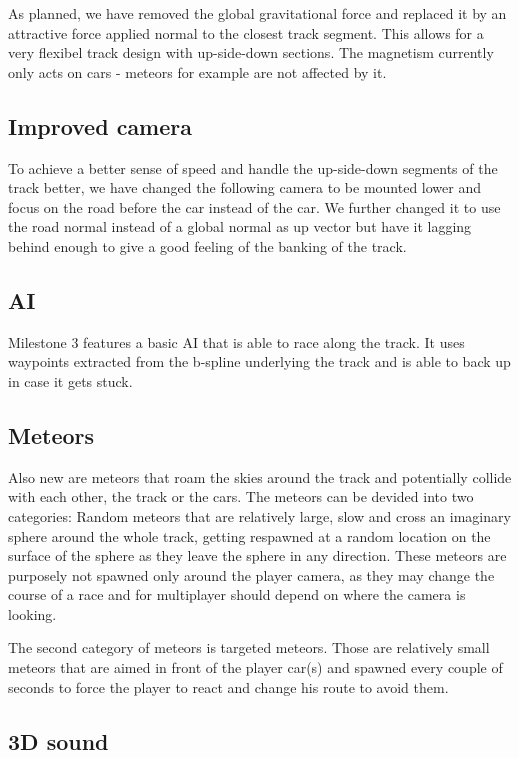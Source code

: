 \documentclass[11pt]{article}
\begin{document}
As planned, we have removed the global gravitational force and replaced it by an attractive force applied normal to the closest track segment.
This allows for a very flexibel track design with up-side-down sections. The magnetism currently only acts on cars - meteors for example are not affected by it.

\subsection{Improved camera}

To achieve a better sense of speed and handle the up-side-down segments of the track better, we have changed the following camera to be mounted lower and focus on the road before the car instead of the car. We further changed it to use the road normal instead of a global normal as up vector but have it lagging behind enough to give a good feeling of the banking of the track.

\subsection{AI}

Milestone 3 features a basic AI that is able to race along the track. It uses waypoints extracted from the b-spline underlying the track and is able to back up in case it gets stuck.

\subsection{Meteors}

Also new are meteors that roam the skies around the track and potentially collide with each other, the track or the cars. The meteors can be devided into two categories: Random meteors that are relatively large, slow and cross an imaginary sphere around the whole track, getting respawned at a random location on the surface of the sphere as they leave the sphere in any direction. These meteors are purposely not spawned only around the player camera, as they may change the course of a race and for multiplayer should depend on where the camera is looking. 

The second category of meteors is targeted meteors. Those are relatively small meteors that are aimed in front of the player car(s) and spawned every couple of seconds to force the player to react and change his route to avoid them.

\subsection{3D sound}
\end{document}

